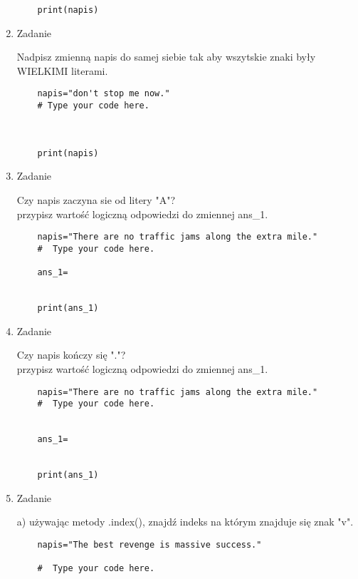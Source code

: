 \documentclass[11pt]{article}
\begin{document}
\begin{enumerate}
\begin{lstlisting}
	
	
	
	print(napis)
\end{lstlisting}

	\item 
\begin{Large}
	Zadanie
\end{Large}
\par
Nadpisz zmienną napis do samej siebie tak aby wszytskie znaki były WIELKIMI literami.
\begin{lstlisting}
	napis="don't stop me now."
	# Type your code here.
	
	
	
	print(napis)
\end{lstlisting}

	\item 
\begin{Large}
	Zadanie
\end{Large}
\par
Czy napis zaczyna sie od litery "A"?\\
przypisz wartość logiczną odpowiedzi do zmiennej ans\_1.
\begin{lstlisting}
	napis="There are no traffic jams along the extra mile."
	#  Type your code here.
	
	ans_1=
	
	
	print(ans_1)
\end{lstlisting}

	\item 
\begin{Large}
	Zadanie
\end{Large}
\par
Czy napis kończy się "."?\\
przypisz wartość logiczną odpowiedzi do zmiennej ans\_1.
\begin{lstlisting}
	napis="There are no traffic jams along the extra mile."
	#  Type your code here.
	
	
	ans_1=
	
	
	print(ans_1)
\end{lstlisting}


	\item 
\begin{Large}
	Zadanie
\end{Large}
\par
a) używając metody .index(), znajdź indeks na którym znajduje się znak "v".
\begin{lstlisting}
	napis="The best revenge is massive success."
	
	#  Type your code here.
	

\end{lstlisting}
\end{enumerate}
\end{document}
